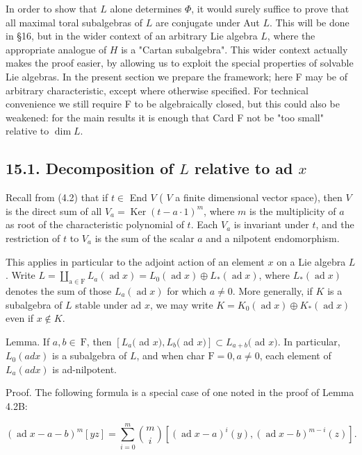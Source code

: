 \documentclass[10pt]{article}
\begin{document}
In order to show that $L$ alone determines $\Phi$, it would surely suffice to prove that all maximal toral subalgebras of $L$ are conjugate under Aut $L$. This will be done in §16, but in the wider context of an arbitrary Lie algebra $L$, where the appropriate analogue of $H$ is a "Cartan subalgebra". This wider context actually makes the proof easier, by allowing us to exploit the special properties of solvable Lie algebras. In the present section we prepare the framework; here F may be of arbitrary characteristic, except where otherwise specified. For technical convenience we still require F to be algebraically closed, but this could also be weakened: for the main results it is enough that Card F not be "too small" relative to $\operatorname{dim} L$.

\subsection*{15.1. Decomposition of $L$ relative to ad $x$}
Recall from (4.2) that if $t \in$ End $V$ ( $V$ a finite dimensional vector space), then $V$ is the direct sum of all $V_{a}=\operatorname{Ker}(t-a \cdot 1)^{m}$, where $m$ is the multiplicity of $a$ as root of the characteristic polynomial of $t$. Each $V_{a}$ is invariant under $t$, and the restriction of $t$ to $V_{a}$ is the sum of the scalar $a$ and a nilpotent endomorphism.

This applies in particular to the adjoint action of an element $x$ on a Lie algebra $L$. Write $L=\coprod_{\mathrm{a} \in \mathrm{F}} L_{a}(\operatorname{ad} x)=L_{0}(\operatorname{ad} x) \oplus L_{*}(\operatorname{ad} x)$, where $L_{*}(\operatorname{ad} x)$ denotes the sum of those $L_{a}(\operatorname{ad} x)$ for which $a \neq 0$. More generally, if $K$ is a subalgebra of $L$ stable under ad $x$, we may write $K=K_{0}(\operatorname{ad} x) \oplus K_{*}(\operatorname{ad} x)$ even if $x \notin K$.

Lemma. If $a, b \in \mathrm{~F}$, then $\left[L_{a}(\right.$ ad $x), L_{b}($ ad $\left.x)\right] \subset L_{a+b}($ ad $x)$. In particular, $L_{0}(a d x)$ is a subalgebra of $L$, and when char $\mathrm{F}=0, a \neq 0$, each element of $L_{a}(a d x)$ is ad-nilpotent.

Proof. The following formula is a special case of one noted in the proof of Lemma 4.2B:

$$
(\operatorname{ad} x-a-b)^{m}[y z]=\sum_{i=0}^{m}\binom{m}{i}\left[(\operatorname{ad} x-a)^{i}(y),(\operatorname{ad} x-b)^{m-i}(z)\right] .
$$
\end{document}
